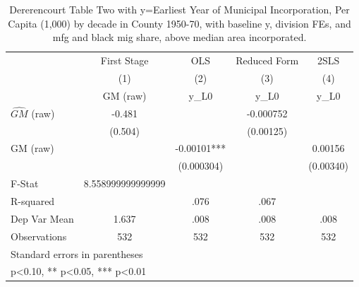 \begin{table}[htbp]\centering
\def\sym#1{\ifmmode^{#1}\else\(^{#1}\)\fi}
\caption{Dererencourt Table Two with y=Earliest Year of Municipal Incorporation, Per Capita (1,000) by decade in County 1950-70, with baseline y, division FEs, and mfg and black mig share, above median area incorporated.}
\begin{tabular}{l*{4}{c}}
\toprule
                    & First Stage   &         OLS   &Reduced Form   &        2SLS   \\
                    &\multicolumn{1}{c}{(1)}&\multicolumn{1}{c}{(2)}&\multicolumn{1}{c}{(3)}&\multicolumn{1}{c}{(4)}\\
                    &\multicolumn{1}{c}{GM  (raw)}&\multicolumn{1}{c}{y\_L0}&\multicolumn{1}{c}{y\_L0}&\multicolumn{1}{c}{y\_L0}\\
\midrule
$\hat{GM}$ (raw)    &      -0.481   &               &   -0.000752   &               \\
                    &     (0.504)   &               &   (0.00125)   &               \\
\addlinespace
GM  (raw)           &               &    -0.00101***&               &     0.00156   \\
                    &               &  (0.000304)   &               &   (0.00340)   \\
\midrule
F-Stat              &8.558999999999999   &               &               &               \\
R-squared           &               &        .076   &        .067   &               \\
Dep Var Mean        &       1.637   &        .008   &        .008   &        .008   \\
Observations        &         532   &         532   &         532   &         532   \\
\bottomrule
\multicolumn{5}{l}{\footnotesize Standard errors in parentheses}\\
\multicolumn{5}{l}{\footnotesize * p<0.10, ** p<0.05, *** p<0.01}\\
\end{tabular}
\end{table}
